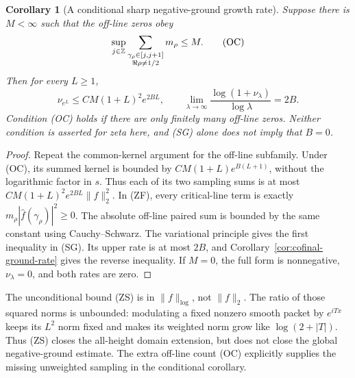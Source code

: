 \documentclass[11pt]{article}
\newtheorem{corollary}[theorem]{Corollary}
\theoremstyle{remark}\newtheorem{remark}[theorem]{Remark}
\newcommand{\Z}{\mathbb Z}
\begin{document}
\begin{corollary}[A conditional sharp negative-ground growth rate]
\label{cor:off-line-count}
Suppose there is $M<\infty$ such that the off-line zeros obey
\[
 \sup_{j\in\Z}
   \sum_{\substack{\gamma_\rho\in[j,j+1]\cr \Re\rho\ne1/2}}
                      m_\rho\le M.                     \tag{OC}
\]
Then for every $L\ge1$,
\[
 \nu_{e^L}\le C M(1+L)^2e^{2BL},\qquad
 \lim_{\lambda\to\infty}
       \frac{\log(1+\nu_\lambda)}{\log\lambda}=2B.       \tag{SG}
\]
Condition (OC) holds if there are only finitely many off-line
zeros. Neither condition is asserted for zeta here, and
(SG) alone does not imply that $B=0$.
\end{corollary}
\begin{proof}
Repeat the common-kernel argument for the off-line subfamily.
Under (OC), its summed kernel is bounded by
$C M(1+L)e^{B(L+1)}$, without the logarithmic factor in $s$.
Thus each of its two sampling sums is at most
$C M(1+L)^2e^{2BL}\|f\|_2^2$.
In (ZF), every critical-line term is exactly
$m_\rho|\widehat f(\gamma_\rho)|^2\ge0$.
The absolute off-line paired sum is bounded by the same
constant using Cauchy--Schwarz. The variational principle
gives the first inequality in (SG). Its upper rate is
at most $2B$, and Corollary~\ref{cor:cofinal-ground-rate} gives
the reverse inequality. If $M=0$, the full form is
nonnegative, $\nu_\lambda=0$, and both rates are zero.
\end{proof}

The unconditional bound (ZS) is in $\|f\|_{\log}$, not
$\|f\|_2$. The ratio of those squared norms is unbounded:
modulating a fixed nonzero smooth packet by $e^{iTx}$
keeps its $L^2$ norm fixed and makes its weighted norm
grow like $\log(2+|T|)$. Thus (ZS) closes the all-height
domain extension, but does not close the global negative-ground
estimate. The extra off-line count (OC) explicitly supplies
the missing unweighted sampling in the conditional corollary.
\end{document}
